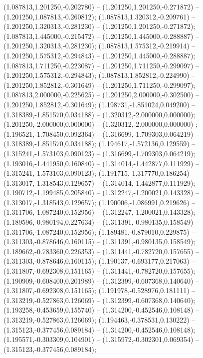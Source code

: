  (1.087813,1.201250,-0.202780) -- (1.201250,1.201250,-0.271872) -- (1.201250,1.087813,-0.260812);
 (1.087813,1.320312,-0.209761) -- (1.201250,1.320313,-0.281230) -- (1.201250,1.201250,-0.271872);
 (1.087813,1.445000,-0.215472) -- (1.201250,1.445000,-0.288887) -- (1.201250,1.320313,-0.281230);
 (1.087813,1.575312,-0.219914) -- (1.201250,1.575312,-0.294843) -- (1.201250,1.445000,-0.288887);
 (1.087813,1.711250,-0.223087) -- (1.201250,1.711250,-0.299097) -- (1.201250,1.575312,-0.294843);
 (1.087813,1.852812,-0.224990) -- (1.201250,1.852812,-0.301649) -- (1.201250,1.711250,-0.299097);
 (1.087813,2.000000,-0.225625) -- (1.201250,2.000000,-0.302500) -- (1.201250,1.852812,-0.301649);
 (1.198731,-1.851024,0.049200) -- (1.318389,-1.851570,0.034188) -- (1.320312,-2.000000,0.000000);
 (1.201250,-2.000000,0.000000) -- (1.320312,-2.000000,0.000000) ;
 (1.196521,-1.708450,0.092364) -- (1.316699,-1.709303,0.064219) -- (1.318389,-1.851570,0.034188);
 (1.194617,-1.572136,0.129559) -- (1.315241,-1.573103,0.090123) -- (1.316699,-1.709303,0.064219);
 (1.193016,-1.441950,0.160840) -- (1.314014,-1.442877,0.111929) -- (1.315241,-1.573103,0.090123);
 (1.191715,-1.317770,0.186254) -- (1.313017,-1.318543,0.129657) -- (1.314014,-1.442877,0.111929);
 (1.190712,-1.199485,0.205840) -- (1.312247,-1.200021,0.143328) -- (1.313017,-1.318543,0.129657);
 (1.190006,-1.086991,0.219626) -- (1.311706,-1.087240,0.152956) -- (1.312247,-1.200021,0.143328);
 (1.189596,-0.980194,0.227634) -- (1.311391,-0.980135,0.158549) -- (1.311706,-1.087240,0.152956);
 (1.189481,-0.879010,0.229875) -- (1.311303,-0.878646,0.160115) -- (1.311391,-0.980135,0.158549);
 (1.189662,-0.783360,0.226353) -- (1.311441,-0.782720,0.157655) -- (1.311303,-0.878646,0.160115);
 (1.190137,-0.693177,0.217063) -- (1.311807,-0.692308,0.151165) -- (1.311441,-0.782720,0.157655);
 (1.190909,-0.608400,0.201989) -- (1.312399,-0.607368,0.140640) -- (1.311807,-0.692308,0.151165);
 (1.191978,-0.528976,0.181111) -- (1.313219,-0.527863,0.126069) -- (1.312399,-0.607368,0.140640);
 (1.193258,-0.453659,0.155740) -- (1.314200,-0.452546,0.108148) -- (1.313219,-0.527863,0.126069);
 (1.194463,-0.378531,0.130222) -- (1.315123,-0.377456,0.089184) -- (1.314200,-0.452546,0.108148);
 (1.195571,-0.303309,0.104901) -- (1.315972,-0.302301,0.069354) -- (1.315123,-0.377456,0.089184);
